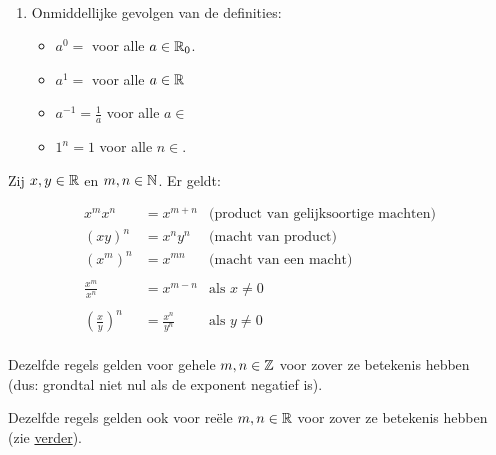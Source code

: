 \documentclass{ximera}
\begin{document}
\begin{remark} \ 
	
	\begin{enumerate}
	\item Onmiddellijke gevolgen van de definities:
			\begin{itemize}
			\item $a^0=$ voor alle $a\in\mathbb{R}_0$.
			\item $a^1=$ voor alle $a\in\mathbb{R}$
			\item $a^{-1}=\frac{1}{a}$ voor alle $a\in$\wordChoice{\choice{$\R$}\choice{$\Rplus$}\choice[correct]{$\Rnul$}}
			\item $1^n=1$ voor alle $n\in$\wordChoice{\choice{$\N$}\choice{$\R$}\choice[correct]{$\Z$}}.
		\end{itemize}
\end{enumerate} 
\end{remark}

\begin{proposition} \label{eig:rekenregels machten}
	Zij $x,y\in\mathbb{R}$ en $m,n\in\mathbb{N}$. Er geldt:
{
	\savebox\strutbox{$\vphantom{\dfrac11^n}$}   %
\begin{align*}
	x^{m}x^{n}  & = x^{m+n}            & \text{(product van gelijksoortige machten)} \\
	(xy)^n      & = x^ny^n             & \text{(macht van product)}\\
	\left(x^{m}\right)^{n} & = x^{mn}  & \text{(macht van een macht)} \\
	\\
	\frac{x^{m}}{x^{n}}    & = x^{m-n} & \text{als }x\neq0\\
	\\
	\left(\frac{x}{y}\right)^{n} & = \frac{x^{n}}{y^{n}} & \text{als }y\neq0\\
\end{align*}

	Dezelfde regels gelden voor gehele $m,n\in\mathbb{Z}$ voor zover ze betekenis hebben 
	\\ (dus: grondtal niet nul als de exponent negatief is).
	
	Dezelfde regels gelden ook voor reële $m,n\in\mathbb{R}$ voor zover ze betekenis hebben
	\\ (zie \hyperref[def:machten met rationale exponent]{verder}).   %
}
\end{proposition}
\end{document}
